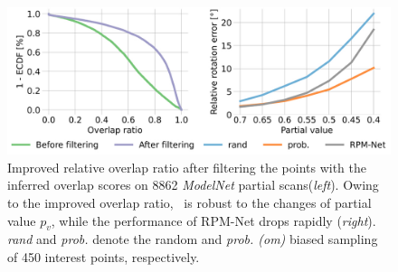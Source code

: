 \begin{figure}[t]
    \centering
    \includegraphics[width=0.8\columnwidth]{figures/images/modelnet.jpg}
    \caption{Improved relative overlap ratio after filtering the points with the inferred overlap scores on 8862 \textit{ModelNet} partial scans(\textit{left}). Owing to the improved overlap ratio, \acro\ is robust to the changes of partial value $p_v$, while the performance of RPM-Net drops rapidly (\textit{right}).  \textit{rand} and \textit{prob.} denote the random and \emph{prob. (om)} biased sampling of 450 interest points, respectively.}%
    \label{fig:modelnet}
    
\end{figure}